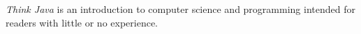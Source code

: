 {\it Think Java} is an introduction to computer science and programming intended for readers with little or no experience.
